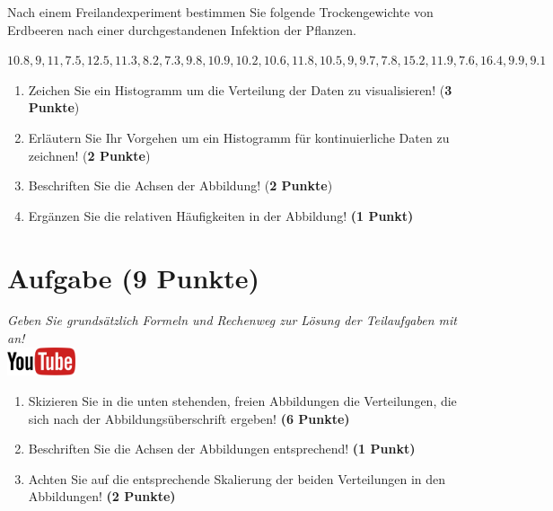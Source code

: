 \documentclass[a4paper, 9pt]{scrartcl}\usepackage[]{graphicx}\usepackage[]{xcolor}
\begin{document}
Nach einem Freilandexperiment bestimmen Sie folgende Trockengewichte von
Erdbeeren nach einer durchgestandenen Infektion der Pflanzen. 

\begin{center}
$10.8, 9, 11, 7.5, 12.5, 11.3, 8.2, 7.3, 9.8, 10.9, 10.2, 10.6, 11.8, 10.5, 9, 9.7, 7.8, 15.2, 11.9, 7.6, 16.4, 9.9, 9.1$
\end{center}

\begin{enumerate}
\item Zeichen Sie ein Histogramm um die Verteilung der Daten zu
  visualisieren! (\textbf{3 Punkte})
 \item Erl{\"a}utern Sie Ihr Vorgehen um ein Histogramm f{\"u}r kontinuierliche
  Daten zu zeichnen!  (\textbf{2 Punkte})
\item Beschriften Sie die Achsen der Abbildung! (\textbf{2 Punkte})
\item Erg{\"a}nzen Sie die relativen H{\"a}ufigkeiten in der Abbildung! \textbf{(1
    Punkt)}  
\end{enumerate}

 
\clearpage

\section{Aufgabe \hfill (9 Punkte)}

\textit{Geben Sie grunds{\"a}tzlich Formeln und Rechenweg zur L{\"o}sung der
  Teilaufgaben mit an!} \\[1Ex]

\hfill\href{https://youtu.be/MiD42k4l5Ag}{\includegraphics[width =
  2cm]{img/youtube}}\\[1Ex]



\begin{enumerate}
\item Skizieren Sie in die unten stehenden, freien Abbildungen die
  Verteilungen, die sich nach der Abbildungs{\"u}berschrift ergeben! \textbf{(6
    Punkte)}
\item Beschriften Sie die Achsen der Abbildungen entsprechend! \textbf{(1
    Punkt)}
\item Achten Sie auf die entsprechende Skalierung der beiden Verteilungen
  in den Abbildungen! \textbf{(2 Punkte)}
\end{enumerate}
\end{document}
